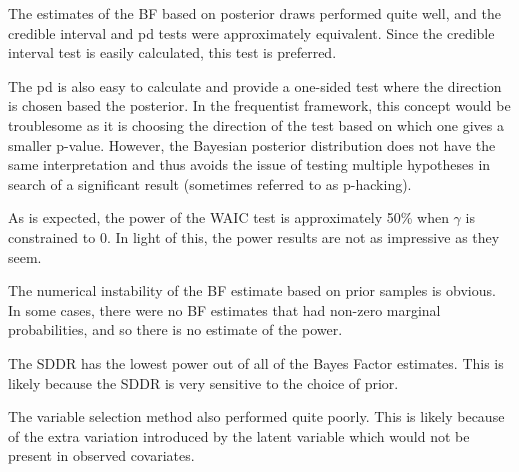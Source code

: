 \documentclass[10pt,letterpaper]{article}
\begin{document}
The estimates of the BF based on posterior draws performed quite well,
and the credible interval and pd tests were approximately equivalent.
Since the credible interval test is easily calculated, this test is
preferred.

The pd is also easy to calculate and provide a one-sided test where the
direction is chosen based the posterior. In the frequentist framework,
this concept would be troublesome as it is choosing the direction of the
test based on which one gives a smaller p-value. However, the Bayesian
posterior distribution does not have the same interpretation and thus
avoids the issue of testing multiple hypotheses in search of a significant result (sometimes referred to as p-hacking).

As is expected, the power of the WAIC test is approximately 50\% when
\(\gamma\) is constrained to 0. In light of this, the power results are
not as impressive as they seem.

The numerical instability of the BF estimate based on prior samples is
obvious. In some cases, there were no BF estimates that had non-zero
marginal probabilities, and so there is no estimate of the power.

The SDDR has the lowest power out of all of the Bayes Factor estimates.
This is likely because the SDDR is very sensitive to the choice of
prior.

The variable selection method also performed quite poorly. This is
likely because of the extra variation introduced by the latent variable
which would not be present in observed covariates.
\nolinenumbers

%
%
%
\end{document}
